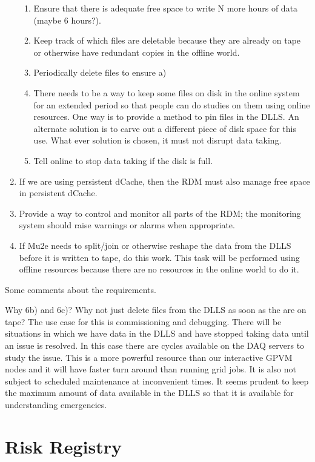\begin{enumerate}
  \begin{enumerate}
   \item Ensure that there is adequate free space to write N more hours of data (maybe 6 hours?).
   \item Keep track of which files are deletable because they are already on tape or otherwise have redundant copies in the offline world.
   \item Periodically delete files to ensure a)
   \item There needs to be a way to keep some files on disk in the online system for an extended period so that
     people can do studies on them using online resources. One way is to provide
     a method to pin files in the DLLS.  An alternate solution is to carve out a different piece of disk
     space for this use.
     What ever solution is chosen, it must not disrupt data taking.
   \item Tell online to stop data taking if the disk is full.
  \end{enumerate}
\item If we are using persistent dCache, then the RDM must also manage free space in persistent dCache.
\item Provide a way to control and monitor all parts of the RDM; the monitoring system should raise warnings or alarms when appropriate.
\item If Mu2e needs to split/join or otherwise reshape the data from the DLLS before it is written to tape, do this work.
  This task will be performed using offline resources because there are no resources in the online world to do it.
\end{enumerate}

Some comments about the requirements.

Why 6b) and 6c)?
Why not just delete files from the DLLS as soon as the are on tape?
The use case for this is commissioning and debugging.
There will be situations in which we have data in the DLLS and have stopped taking data
until an issue is resolved.
In this case there are cycles available on the DAQ servers to study the issue.
This is a more powerful resource than our interactive GPVM nodes and
it will have faster turn around than running grid jobs.
It is also not subject to scheduled maintenance at inconvenient times.
It seems prudent to keep the maximum amount of data available in the DLLS so that
it is available for understanding emergencies.


\chapter{Risk Registry}
\label{ch:RiskRegistry}

